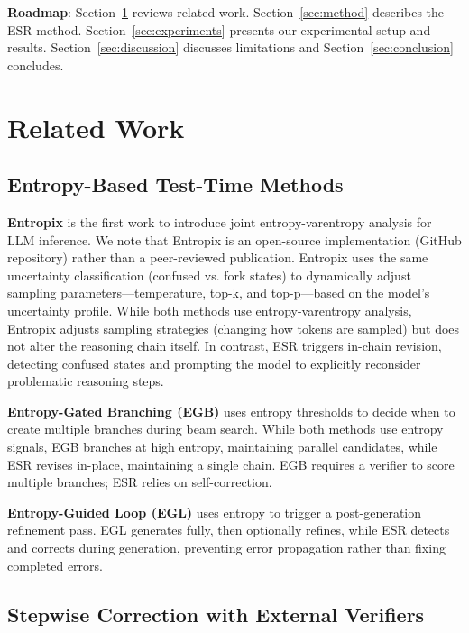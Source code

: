 \documentclass{article}
\begin{document}
\textbf{Roadmap}: Section~\ref{sec:related} reviews related work. Section~\ref{sec:method} describes the ESR method. Section~\ref{sec:experiments} presents our experimental setup and results. Section~\ref{sec:discussion} discusses limitations and Section~\ref{sec:conclusion} concludes.

\section{Related Work}
\label{sec:related}

\subsection{Entropy-Based Test-Time Methods}

\textbf{Entropix} \citep{xjdr2024entropix} is the first work to introduce joint entropy-varentropy analysis for LLM inference. We note that Entropix is an open-source implementation (GitHub repository) rather than a peer-reviewed publication. Entropix uses the same uncertainty classification (confused vs. fork states) to dynamically adjust sampling parameters---temperature, top-k, and top-p---based on the model's uncertainty profile. While both methods use entropy-varentropy analysis, Entropix adjusts sampling strategies (changing how tokens are sampled) but does not alter the reasoning chain itself. In contrast, ESR triggers in-chain revision, detecting confused states and prompting the model to explicitly reconsider problematic reasoning steps.

\textbf{Entropy-Gated Branching (EGB)} \citep{li2025entropy} uses entropy thresholds to decide when to create multiple branches during beam search. While both methods use entropy signals, EGB branches at high entropy, maintaining parallel candidates, while ESR revises in-place, maintaining a single chain. EGB requires a verifier to score multiple branches; ESR relies on self-correction.

\textbf{Entropy-Guided Loop (EGL)} \citep{correa2025entropy} uses entropy to trigger a post-generation refinement pass. EGL generates fully, then optionally refines, while ESR detects and corrects during generation, preventing error propagation rather than fixing completed errors.

\subsection{Stepwise Correction with External Verifiers}
\end{document}

